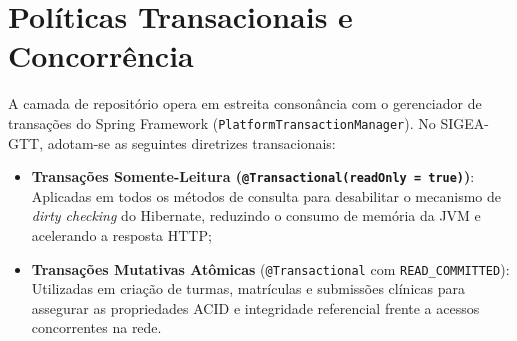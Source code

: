 \section{Políticas Transacionais e Concorrência}
\label{sec_politicas_transacionais}

A camada de repositório opera em estreita consonância com o gerenciador de transações do Spring Framework (\texttt{PlatformTransactionManager}). No SIGEA-GTT, adotam-se as seguintes diretrizes transacionais:
\begin{itemize}
    \item \textbf{Transações Somente-Leitura (\texttt{@Transactional(readOnly = true)})}: Aplicadas em todos os métodos de consulta para desabilitar o mecanismo de \textit{dirty checking} do Hibernate, reduzindo o consumo de memória da JVM e acelerando a resposta HTTP;
    \item \textbf{Transações Mutativas Atômicas} (\texttt{@Transactional} com \texttt{READ\_COMMITTED}): Utilizadas em criação de turmas, matrículas e submissões clínicas para assegurar as propriedades ACID e integridade referencial frente a acessos concorrentes na rede.
\end{itemize}
